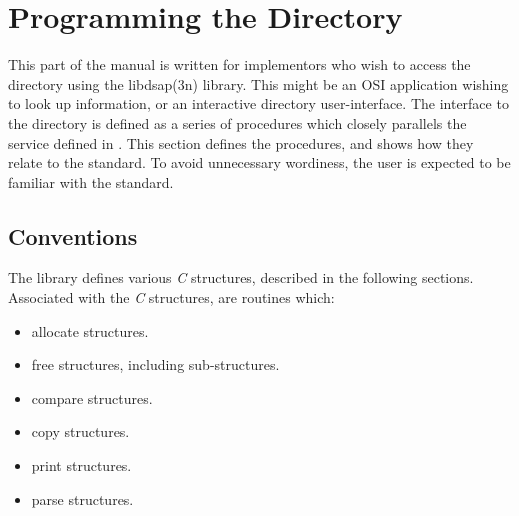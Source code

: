 
\chapter {Programming the Directory}

This part of the manual is written for implementors who wish to access the
directory using the \man libdsap(3n) library.
This might be an OSI application wishing to look up information,
or an interactive directory user-interface.
The interface to the directory is defined as a series of procedures which
closely parallels the service defined in \cite{CCITT.Directory}.  This section
defines the procedures,
and shows how they relate to the standard.
To avoid unnecessary wordiness, the user is expected to be familiar with
the standard.

\section      {Conventions}
\label{quipu_conv}

The library defines various {\em C} structures, described in the 
following sections.
Associated with the {\em C} structures, are routines which:

\begin{itemize}
\item allocate structures.

\item free structures, including sub-structures.

\item compare structures.

\item copy structures.

\item print structures.

\item parse structures.
\end{itemize}

